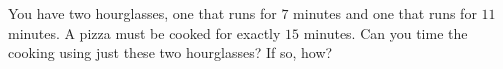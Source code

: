 You have two hourglasses, one that runs for $7$ minutes and one that runs for $11$ minutes. A pizza must be cooked for exactly $15$ minutes. Can you time the cooking using just these two hourglasses? If so, how?
